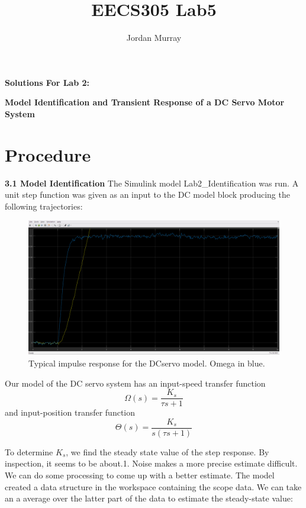 \documentclass[11pt,a4paper]{article}
\author{Jordan Murray}
\title{EECS305 Lab5}
\begin{document}
\begin{center}
\fontsize{24}{12}\selectfont
\textbf{Solutions For Lab 2:}

\textbf{ Model Identification and Transient Response of a DC Servo Motor System }
\end{center}

\section{Procedure}
\textbf{3.1 Model Identification}
The Simulink model Lab2\_Identification was run. A unit step function was given as an input to the DC model block producing the following trajectories:

\begin{figure}[here]
\includegraphics[width=\textwidth]{imglab/lab2sol_identification1.png}
\caption{Typical impulse response for the DCservo model. Omega in blue.}
\label{fig:id1}
\end{figure}

Our model of the DC servo system has an input-speed transfer function
\begin{equation}
	\Omega \left( s \right) = \frac{K_{s}}{\tau s + 1}
\end{equation}
and input-position transfer function
\begin{equation}
	\Theta \left( s \right) = \frac{K_{s}}{s \left( \tau s + 1 \right)}
\end{equation}

 To determine $K_{s}$, we find the steady state value of the step response. By inspection, it seems to be about.1. Noise makes a more precise estimate difficult. We can do some processing to come up with a better estimate. The model created a data structure in the workspace containing the scope data. We can take an a average over the latter part of the data to estimate the steady-state value:
 
\end{document}
